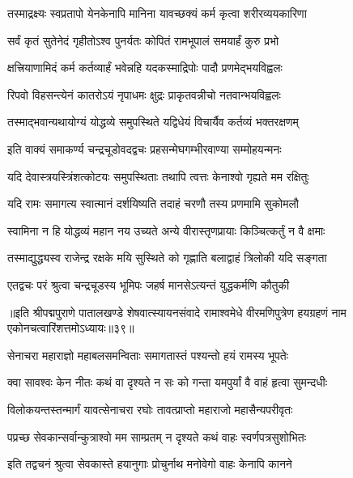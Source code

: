 \twolineshloka
{तस्माद्रक्ष्यः स्वप्रतापो येनकेनापि मानिना}
{यावच्छक्यं कर्म कृत्वा शरीरव्ययकारिणा}%

\twolineshloka
{सर्वं कृतं सुतेनेदं गृहीतोऽश्व पुनर्यतः}
{कोपितं रामभूपालं समयार्हं कुरु प्रभो}%

\twolineshloka
{क्षत्त्रियाणामिदं कर्म कर्तव्यार्हं भवेन्नहि}
{यदकस्माद्रिपोः पादौ प्रणमेद्भयविह्वलः}%

\twolineshloka
{रिपवो विहसन्त्येनं कातरोऽयं नृपाधमः}
{क्षुद्रः प्राकृतवन्नीचो नतवान्भयविह्वलः}%

\twolineshloka
{तस्माद्भवान्यथायोग्यं योद्धव्ये समुपस्थिते}
{यद्विधेयं विचार्यैव कर्तव्यं भक्तरक्षणम्}%


\twolineshloka
{इति वाक्यं समाकर्ण्य चन्द्रचूडोवदद्वचः}
{प्रहसन्मेघगम्भीरवाण्या सम्मोहयन्मनः}%

\twolineshloka
{यदि देवास्त्रयस्त्रिंशत्कोटयः समुपस्थिताः}
{तथापि त्वत्तः केनाश्वो गृह्यते मम रक्षितुः}%

\twolineshloka
{यदि रामः समागत्य स्वात्मानं दर्शयिष्यति}
{तदाहं चरणौ तस्य प्रणमामि सुकोमलौ}%

\twolineshloka
{स्वामिना न हि योद्धव्यं महान नय उच्यते}
{अन्ये वीरास्तृणप्रायाः किञ्चित्कर्तुं न वै क्षमाः}%

\twolineshloka
{तस्माद्युद्ध्यस्व राजेन्द्र रक्षके मयि सुस्थिते}
{को गृह्णाति बलाद्वाहं त्रिलोकी यदि सङ्गता}%


\twolineshloka
{एतद्वचः परं श्रुत्वा चन्द्रचूडस्य भूमिपः}
{जहर्ष मानसेऽत्यन्तं युद्धकर्मणि कौतुकी}%

{॥इति श्रीपद्मपुराणे पातालखण्डे शेषवात्स्यायनसंवादे रामाश्वमेधे वीरमणिपुत्रेण हयग्रहणं नाम एकोनचत्वारिंशत्तमोऽध्यायः॥३९॥}



\twolineshloka
{सेनाचरा महाराज्ञो महाबलसमन्विताः}
{समागतास्तं पश्यन्तो हयं रामस्य भूपतेः}%

\twolineshloka
{क्वा सावश्वः केन नीतः कथं वा दृश्यते न सः}
{को गन्ता यमपुर्यां वै वाहं हृत्वा सुमन्दधीः}%

\twolineshloka
{विलोकयन्तस्तन्मार्गं यावत्सेनाचरा रघोः}
{तावत्प्राप्तो महाराजो महासैन्यपरीवृतः}%

\twolineshloka
{पप्रच्छ सेवकान्सर्वान्कुत्राश्वो मम साम्प्रतम्}
{न दृश्यते कथं वाहः स्वर्णपत्रसुशोभितः}%

\twolineshloka
{इति तद्वचनं श्रुत्वा सेवकास्ते हयानुगाः}
{प्रोचुर्नाथ मनोवेगो वाहः केनापि कानने}%


